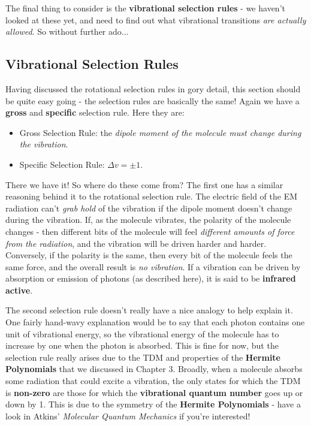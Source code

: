 \documentclass{memoir}[11pt,oneside,a4paper,openany]
\begin{document}
The final thing to consider is the \textbf{vibrational selection rules} - we haven't looked at these yet, and need to find out what vibrational transitions \emph{are actually allowed}. So without further ado...

\subsection{Vibrational Selection Rules}
Having discussed the rotational selection rules in gory detail, this section should be quite easy going - the selection rules are basically the same! Again we have a \textbf{gross} and \textbf{specific} selection rule. Here they are:
\begin{itemize}
	\item Gross Selection Rule: the \emph{dipole moment of the molecule \emph{must} change during the vibration}.
	\item Specific Selection Rule: $\Delta v = \pm 1$.
\end{itemize}
There we have it! So where do these come from? The first one has a similar reasoning behind it to the rotational selection rule. The electric field of the EM radiation can't \emph{grab hold} of the vibration if the dipole moment doesn't change during the vibration. If, as the molecule vibrates, the polarity of the molecule changes - then different bits of the molecule will feel \emph{different amounts of force from the radiation}, and the vibration will be driven harder and harder. Conversely, if the polarity is the same, then every bit of the molecule feels the same force, and the overall result is \emph{no vibration}. If a vibration can be driven by absorption or emission of photons (as described here), it is said to be \textbf{infrared active}. 

The second selection rule doesn't really have a nice analogy to help explain it. One fairly hand-wavy explanation would be to say that each photon contains one unit of vibrational energy, so the vibrational energy of the molecule has to increase by one when the photon is absorbed. This is fine for now, but the selection rule really arises due to the TDM and properties of the \textbf{Hermite Polynomials} that we discussed in Chapter 3. Broadly, when a molecule absorbs some radiation that could excite a vibration, the only states for which the TDM is \textbf{non-zero} are those for which the \textbf{vibrational quantum number} goes up or down by 1. This is due to the symmetry of the \textbf{Hermite Polynomials} - have a look in Atkins' \emph{Molecular Quantum Mechanics} if you're interested! 
\end{document}

